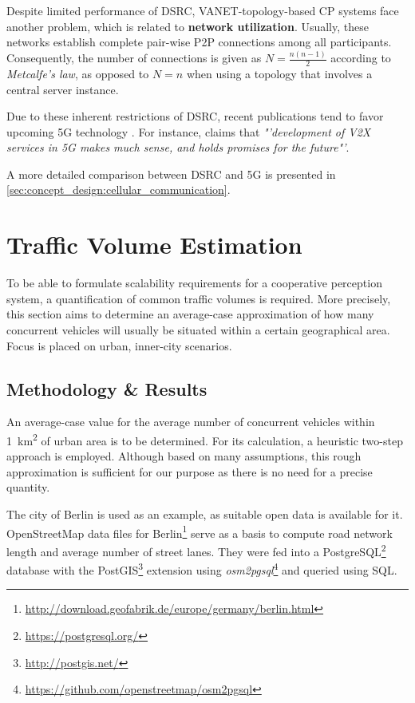 Despite limited performance of DSRC, VANET-topology-based CP systems face another problem, which is related to \textbf{network utilization}. Usually, these networks establish complete pair-wise P2P connections among all participants. Consequently, the number of connections is given as $N = \frac{n(n-1)}{2 }$ according to \textit{Metcalfe's law}, as opposed to $N = n$ when using a topology that involves a central server instance.

Due to these inherent restrictions of DSRC, recent publications tend to favor upcoming 5G technology \cite{Briegleb2019, 5GAutomotiveAssociation2016}. For instance, \cite{Wevers2017} claims that \textit{"'development of V2X services in 5G makes much sense, and holds promises for the future"'}.

A more detailed comparison between DSRC and 5G is presented in \cref{sec:concept_design:cellular_communication}.

\section{Traffic Volume Estimation}
\label{sec:problem_analysis:traffic_volume_estimation}

To be able to formulate scalability requirements for a cooperative perception system, a quantification of common traffic volumes is required. More precisely, this section aims to determine an average-case approximation of how many concurrent vehicles will usually be situated within a certain geographical area. Focus is placed on urban, inner-city scenarios. 

\subsection{Methodology \& Results}
\label{subsec:problem_analysis:methodology_results}
An average-case value for the average number of concurrent vehicles within \SI{1}{\square\kilo\meter} of urban area is to be determined. For its calculation, a heuristic two-step approach is employed. Although based on many assumptions, this rough approximation is sufficient for our purpose as there is no need for a precise quantity. 

The city of Berlin is used as an example, as suitable open data is available for it. OpenStreetMap data files for Berlin\footnote{\url{http://download.geofabrik.de/europe/germany/berlin.html}} serve as a basis to compute road network length and average number of street lanes. They were fed into a PostgreSQL\footnote{\url{https://postgresql.org/}} database with the PostGIS\footnote{\url{http://postgis.net/}} extension using \textit{osm2pgsql}\footnote{\url{https://github.com/openstreetmap/osm2pgsql}} and queried using SQL.

